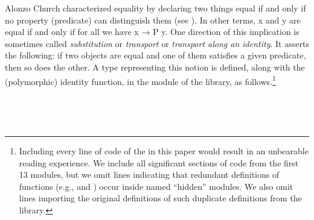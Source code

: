 Alonzo Church characterized equality by declaring two things equal if and only if no property (predicate) can distinguish them (see \cite{Church:1940}). In other terms, \ab x and \ab y are equal if and only if for all  we have  \ab x \as → \ab P \ab y. One direction of this implication is sometimes called \emph{substitution} or \emph{transport} or \emph{transport along an identity}. It asserts the following: if two objects are equal and one of them satisfies a given predicate, then so does the other. A type representing this notion is defined, along with the (polymorphic) identity function, in the  module of the \typetopology library, as follows.\footnote{Including every line of code of the \agdaualib in this paper would result in an unbearable reading experience. We include all significant sections of code from the first 13 modules, but we omit lines indicating that redundant definitions of functions (e.g.,  and ) occur inside named ``hidden'' modules. We also omit lines importing the original definitions of such duplicate definitions from the \typetopology library.}
\ccpad
\begin{code}%
\>[1]\AgdaSpace{}%
\AgdaSymbol{:}\AgdaSpace{}%
\AgdaSymbol{\{}\AgdaSpace{}%
\AgdaSymbol{:}\AgdaSpace{}%
\AgdaSymbol{\}}\AgdaSpace{}%
\AgdaSymbol{(}\AgdaSpace{}%
\AgdaSymbol{:}\AgdaSpace{}%
\AgdaSpace{}%
\AgdaSpace{}%
\AgdaSymbol{)}\AgdaSpace{}%
\AgdaSpace{}%
\AgdaSpace{}%
\AgdaSpace{}%
\<%
\\
%
\>[1]\AgdaSpace{}%
\AgdaSpace{}%
\AgdaSymbol{=}\AgdaSpace{}%
\AgdaSpace{}%
\AgdaSpace{}%
\AgdaSpace{}%
\<%
\end{code}
\scpad
\begin{code}
\>[1]\AgdaSpace{}%
\AgdaSymbol{:}\AgdaSpace{}%
\AgdaSymbol{\{}\AgdaSpace{}%
\AgdaSymbol{:}\AgdaSpace{}%
\AgdaSpace{}%
\AgdaSpace{}%
\AgdaSymbol{\}}\AgdaSpace{}%
\AgdaSymbol{(}\AgdaSpace{}%
\AgdaSymbol{:}\AgdaSpace{}%
\AgdaSpace{}%
\AgdaSpace{}%
\AgdaSpace{}%
\AgdaSpace{}%
\AgdaSymbol{)}\AgdaSpace{}%
\AgdaSymbol{\{}\AgdaSpace{}%
\AgdaSpace{}%
\AgdaSymbol{:}\AgdaSpace{}%
\AgdaSymbol{\}}\AgdaSpace{}%
\AgdaSpace{}%
\AgdaSpace{}%
\AgdaSpace{}%
\AgdaSpace{}%
\AgdaSpace{}%
\AgdaSpace{}%
\AgdaSpace{}%
\AgdaSpace{}%
\AgdaSpace{}%
\<%
\\
%
\>[1]\AgdaSpace{}%
\AgdaSpace{}%
\AgdaSymbol{(}\AgdaSpace{}%
\AgdaSymbol{\{}\AgdaSpace{}%
\AgdaSymbol{=}\AgdaSpace{}%
\AgdaSymbol{\})}\AgdaSpace{}%
\AgdaSymbol{=}\AgdaSpace{}%
\AgdaSpace{}%
\AgdaSymbol{(}\AgdaSpace{}%
\AgdaSymbol{)}\<%
\end{code}
